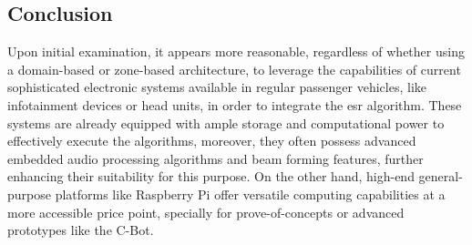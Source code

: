 \subsection{Conclusion}
\label{subsec:ECU_conclusion}

Upon initial examination, it appears more reasonable, regardless of whether using a domain-based or zone-based architecture, to leverage the capabilities of current sophisticated electronic systems available in regular passenger vehicles, like infotainment devices or head units, in order to integrate the \gls{esr} algorithm. These systems are already equipped with ample storage and computational power to effectively execute the algorithms, moreover, they often possess advanced embedded audio processing algorithms and beam forming features, further enhancing their suitability for this purpose. On the other hand, high-end general-purpose platforms like Raspberry Pi offer versatile computing capabilities at a more accessible price point, specially for prove-of-concepts or advanced prototypes like the C-Bot.

